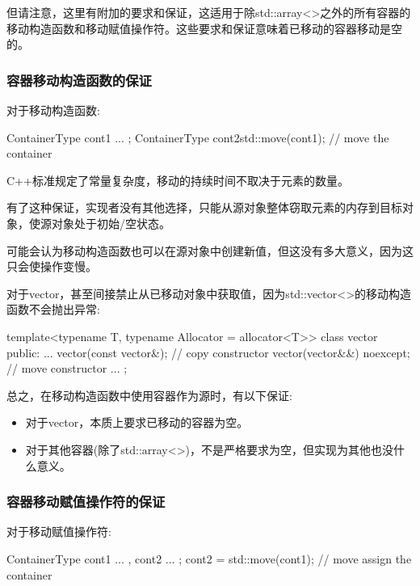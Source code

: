 但请注意，这里有附加的要求和保证，这适用于除std::array<>之外的所有容器的移动构造函数和移动赋值操作符。这些要求和保证意味着已移动的容器移动是空的。

\subsubsection{容器移动构造函数的保证}

对于移动构造函数:

\begin{cppcode}
ContainerType cont1{ ... };
ContainerType cont2{std::move(cont1)}; // move the container
\end{cppcode}

C++标准规定了常量复杂度，移动的持续时间不取决于元素的数量。

有了这种保证，实现者没有其他选择，只能从源对象整体窃取元素的内存到目标对象，使源对象处于初始/空状态。

可能会认为移动构造函数也可以在源对象中创建新值，但这没有多大意义，因为这只会使操作变慢。

对于vector，甚至间接禁止从已移动对象中获取值，因为std::vector<>的移动构造函数不会抛出异常:

\begin{cppcode}
template<typename T, typename Allocator = allocator<T>>
class vector {
	public:
	...
	vector(const vector&); // copy constructor
	vector(vector&&) noexcept; // move constructor
	...
};
\end{cppcode}

总之，在移动构造函数中使用容器作为源时，有以下保证:

\begin{itemize}
	\item 对于vector，本质上要求已移动的容器为空。
	\item 对于其他容器(除了std::array<>)，不是严格要求为空，但实现为其他也没什么意义。
\end{itemize}

\subsubsection{容器移动赋值操作符的保证}

对于移动赋值操作符:

\begin{cppcode}
ContainerType cont1{ ... }, cont2{ ... };
cont2 = std::move(cont1); // move assign the container
\end{cppcode}

